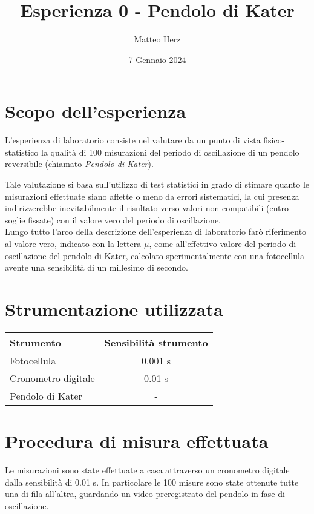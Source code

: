 \documentclass{article}
\title{Esperienza 0 - Pendolo di Kater}
\author{Matteo Herz}
\date{7 Gennaio 2024}
\begin{document}


\newpage

\tableofcontents 

\newpage 
\section{Scopo dell'esperienza}
L'esperienza di laboratorio consiste nel valutare da un punto di vista fisico-statistico la qualità di 100 misurazioni del periodo di oscillazione di un pendolo reversibile (chiamato \textit{Pendolo di Kater}). 

Tale valutazione si basa sull'utilizzo di test statistici in grado di stimare quanto le misurazioni effettuate siano affette o meno da errori sistematici, la cui presenza indirizzerebbe inevitabilmente il risultato verso valori non compatibili (entro soglie fissate) con il valore vero del periodo di oscillazione. \\

Lungo tutto l'arco della descrizione dell'esperienza di laboratorio farò riferimento al valore vero, indicato con la lettera $\mu$, come all'effettivo valore del periodo di oscillazione del pendolo di Kater, calcolato sperimentalmente con una fotocellula avente una sensibilità di un millesimo di secondo.

\section{Strumentazione utilizzata}

\begin{table}[ht]
	\centering
	\begin{tabular}{@{}lc@{}}
		\toprule
		\textbf{Strumento} & \textbf{Sensibilità strumento} \\
		\midrule
		Fotocellula & 0.001 s \\
		Cronometro digitale & 0.01 s \\
		Pendolo di Kater & - \\
		\bottomrule
	\end{tabular}
\end{table}

\section{Procedura di misura effettuata}
Le misurazioni sono state effettuate a casa attraverso un cronometro digitale dalla sensibilità di 0.01 s.
In particolare le 100 misure sono state ottenute tutte una di fila all'altra, guardando un video preregistrato del pendolo in fase di oscillazione.
\end{document}
